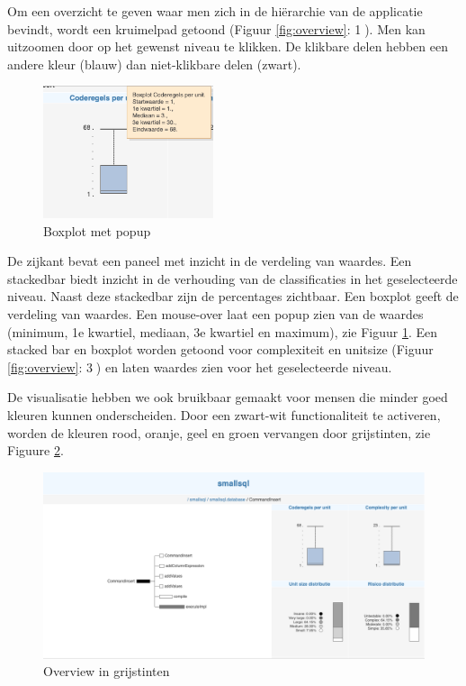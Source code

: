 \documentclass[a4paper]{article}
\begin{document}
Om een overzicht te geven waar men zich in de hiërarchie van de applicatie bevindt, wordt een kruimelpad getoond (Figuur \ref{fig:overview}: \textcircled{1}). Men kan uitzoomen door op het gewenst niveau te klikken. De klikbare delen hebben een andere kleur (blauw) dan niet-klikbare delen (zwart).
\begin{figure}[h]
\centering
  \includegraphics[width=5cm]{images/boxplot_popup.png}
  \caption{Boxplot met popup}
  \label{fig:boxplot_popup}
\end{figure}


De zijkant bevat een paneel met inzicht in de verdeling van waardes. Een stackedbar biedt inzicht in de verhouding van de classificaties in het geselecteerde niveau. Naast deze stackedbar zijn de percentages zichtbaar. Een boxplot geeft de verdeling van waardes. Een mouse-over laat een popup zien van de waardes (minimum, 1e kwartiel, mediaan, 3e kwartiel en maximum), zie Figuur \ref{fig:boxplot_popup}.
Een stacked bar en boxplot worden getoond voor complexiteit en unitsize (Figuur \ref{fig:overview}: \textcircled{3}) en laten waardes zien voor het geselecteerde niveau.

De visualisatie hebben we ook bruikbaar gemaakt voor mensen die minder goed kleuren kunnen onderscheiden. Door een zwart-wit functionaliteit te activeren, worden de kleuren rood, oranje, geel en groen vervangen door grijstinten, zie Figuure \ref{fig:overview_blackwhite}.
\begin{figure}[h]
\centering
  \includegraphics[width=\linewidth]{images/overview_blackwhite.png}
  \caption{Overview in grijstinten}
  \label{fig:overview_blackwhite}
\end{figure}
\end{document}

